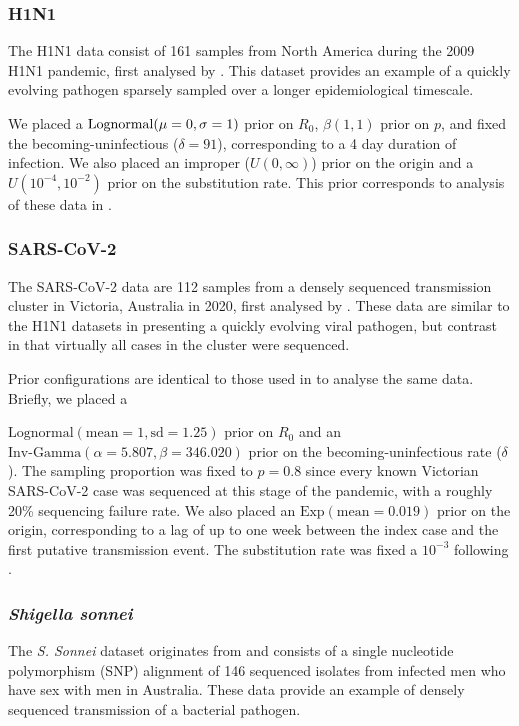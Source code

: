 \documentclass{article}
\begin{document}
\begin{spacing}{1.5}
\subsubsection*{H1N1}
The H1N1 data consist of 161 samples from North America during the 2009 H1N1 pandemic, first analysed by \citet{hedge_2013_real-time}. This  dataset provides an example of a quickly evolving pathogen sparsely sampled over a longer epidemiological timescale. 

We placed a $\textnormal{Lognormal}(\mu=0,\sigma=1)$ prior on $R_0$, $\beta(1,1)$ prior on $p$, and fixed the becoming-uninfectious ($\delta = 91$), corresponding to a 4 day duration of infection. We also placed an improper ($U(0,\infty)$) prior on the origin and a $U(10^{-4},10^{-2})$ prior on the substitution rate. This prior corresponds to analysis of these data in \citet{featherstone_decoding_2023}.

\subsubsection*{SARS-CoV-2}
The SARS-CoV-2 data are 112 samples from a densely sequenced transmission cluster in Victoria, Australia in 2020, first analysed by \citet{lane2021genomics}. These data are similar to the H1N1 datasets in presenting a quickly evolving viral pathogen, but contrast in that virtually all cases in the cluster were sequenced. 

Prior configurations are identical to those used in \citet{featherstone_decoding_2023} to analyse the same data. Briefly, we placed a 

$\textrm{Lognormal}(\textrm{mean}=1, \textrm{sd}=1.25)$ prior on $R_0$ and an $\textrm{Inv-Gamma}(\alpha=5.807, \beta=346.020)$ prior on the becoming-uninfectious rate ($\delta$).  The sampling proportion was fixed to $p=0.8$ since every known Victorian SARS-CoV-2 case was sequenced at this stage of the pandemic, with a roughly 20\% sequencing failure rate. We also placed an $\textrm{Exp}(\textrm{mean}=0.019)$ prior on the origin, corresponding to a lag of up to one week  between the index case and the first putative transmission event. The substitution rate was fixed a $10^{-3}$ following \citep{duchene_temporal_2020}.

\subsubsection*{\textit{Shigella sonnei}}
The \textit{S. Sonnei} dataset originates from \citet{ingle_co-circulation_2019} and consists of a single nucleotide polymorphism (SNP) alignment of 146 sequenced isolates from infected men who have sex with men in Australia. These data provide an example of densely sequenced transmission of a bacterial pathogen. 


\end{spacing}
\end{document}
